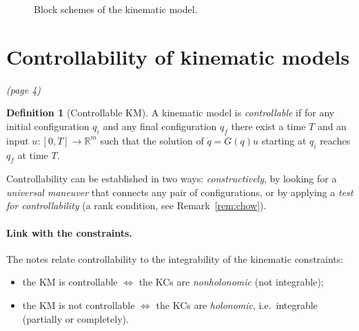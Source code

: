 \documentclass[11pt,a4paper]{article}
\newcommand{\R}{\mathbb{R}}
\newcommand{\dq}{\dot q}
\theoremstyle{definition}
\newtheorem{definition}{Definition}[section]
\theoremstyle{plain}
\theoremstyle{remark}
\begin{document}
\begin{figure}[h]
\centering
{}
\caption{Block schemes of the kinematic model.}
\end{figure}

\section{Controllability of kinematic models}\emph{(page 4)}

\begin{definition}[Controllable KM]
A kinematic model is \emph{controllable} if for any initial configuration $q_i$ and any final configuration $q_f$ there exist a time $T$ and an input $u:[0,T]\to\R^m$ such that the solution of $\dq=G(q)u$ starting at $q_i$ reaches $q_f$ at time $T$.
\end{definition}

Controllability can be established in two ways: \emph{constructively}, by looking for a \emph{universal maneuver} that connects any pair of configurations, or by applying a \emph{test for controllability} (a rank condition, see Remark~\ref{rem:chow}).

\paragraph{Link with the constraints.} The notes relate controllability to the integrability of the kinematic constraints:
\begin{itemize}[nosep]
\item the KM is controllable $\iff$ the KCs are \emph{nonholonomic} (not integrable);
\item the KM is not controllable $\iff$ the KCs are \emph{holonomic}, i.e.\ integrable (partially or completely).
\end{itemize}
\end{document}
